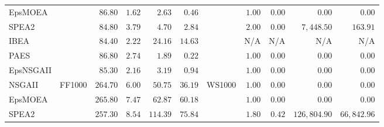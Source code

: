 \begin{table}[b]
{\begin{tabular}{
        |l||
        l|
        r
        r|
        r
        r
        ||l|
        r
        r|
        r
        r|
      }
      EpsMOEA    &                           & $\mathbf{86.80}$                 & $\mathbf{1.62}$                  & $2.63$          & $0.46$                           &                                 & $1.00$            & $0.00$          & $0.00$              & $0.00$           \\
      SPEA2      &                           & $84.80$                          & $3.79$                           & $4.70$          & $2.84$                           &                                 & $\mathbf{2.00}$   & $\mathbf{0.00}$ & $7,448.50$          & $163.91$         \\
      IBEA       &                           & $84.40$                          & $2.22$                           & $24.16$         & $14.63$                          &                                 & N/A               & N/A             & N/A                 & N/A              \\
      PAES       &                           & $\mathbf{86.80}$                 & $\mathbf{2.74}$                  & $\mathbf{1.89}$ & $\mathbf{0.22}$                  &                                 & $1.00$            & $0.00$          & $0.00$              & $0.00$           \\
      EpsNSGAII  &                           & $85.30$                          & $2.16$                           & $3.19$          & $0.94$                           &                                 & $1.00$            & $0.00$          & $0.00$              & $0.00$           \\
      \hline
      NSGAII     & \multirow{6}{*}{ FF1000 } & $264.70$                         & $6.00$                           & $50.75$         & $36.19$                          & \multirow{6}{*}{ WS1000 }       & $1.00$            & $0.00$          & $0.00$              & $0.00$           \\
      EpsMOEA    &                           & $265.80$                         & $7.47$                           & $62.87$         & $60.18$                          &                                 & $1.00$            & $0.00$          & $0.00$              & $0.00$           \\
      SPEA2      &                           & $257.30$                         & $8.54$                           & $114.39$        & $75.84$                          &                                 & $\mathbf{1.80}$   & $\mathbf{0.42}$ & $126,804.90$        & $66,842.96$      \\

\end{tabular}}
\end{table}

